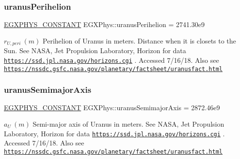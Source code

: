 \subsubsection{\texorpdfstring{uranus\+Perihelion}{uranusPerihelion}}
{\footnotesize\ttfamily \mbox{\hyperlink{group___e_g_x_phys-_constants-_macros_ga76980d288494ce1714c9ac68a95ba702}{E\+G\+X\+P\+H\+Y\+S\+\_\+\+C\+O\+N\+S\+T\+A\+NT}} E\+G\+X\+Phys\+::uranus\+Perihelion = 2741.\+30e9}

$ r_{U,peri} \ (m)$ Perihelion of Uranus in meters. Distance when it is closets to the Sun. See N\+A\+SA, Jet Propulsion Laboratory, Horizon for data \href{https://ssd.jpl.nasa.gov/horizons.cgi}{\tt https\+://ssd.\+jpl.\+nasa.\+gov/horizons.\+cgi} . Accessed 7/16/18. Also see \href{https://nssdc.gsfc.nasa.gov/planetary/factsheet/uranusfact.html}{\tt https\+://nssdc.\+gsfc.\+nasa.\+gov/planetary/factsheet/uranusfact.\+html} \mbox{\label{group___e_g_x_phys-_constants-_astrophysics-_solar_system-_uranus-_orbit_ga34dc0986eab0b7450cf80dc5b17cd892}} 
\subsubsection{\texorpdfstring{uranus\+Semimajor\+Axis}{uranusSemimajorAxis}}
{\footnotesize\ttfamily \mbox{\hyperlink{group___e_g_x_phys-_constants-_macros_ga76980d288494ce1714c9ac68a95ba702}{E\+G\+X\+P\+H\+Y\+S\+\_\+\+C\+O\+N\+S\+T\+A\+NT}} E\+G\+X\+Phys\+::uranus\+Semimajor\+Axis = 2872.\+46e9}

$ a_{U} \ (m)$ Semi-\/major axis of Uranus in meters. See N\+A\+SA, Jet Propulsion Laboratory, Horizon for data \href{https://ssd.jpl.nasa.gov/horizons.cgi}{\tt https\+://ssd.\+jpl.\+nasa.\+gov/horizons.\+cgi} . Accessed 7/16/18. Also see \href{https://nssdc.gsfc.nasa.gov/planetary/factsheet/uranusfact.html}{\tt https\+://nssdc.\+gsfc.\+nasa.\+gov/planetary/factsheet/uranusfact.\+html} \mbox{\label{group___e_g_x_phys-_constants-_astrophysics-_solar_system-_uranus-_orbit_gaf2077b1c1b606d34f14b5d23ca2c160a}} 
